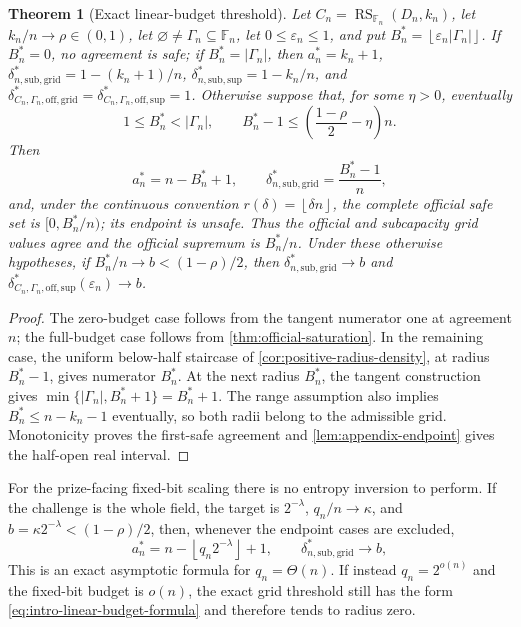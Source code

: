 \documentclass[11pt,a4paper]{amsart}
\numberwithin{equation}{section}
\newtheorem{theorem}{Theorem}[section]
\theoremstyle{remark}
\DeclareMathOperator{\RS}{RS}
\newcommand{\F}{\mathbb F}
\newcommand{\eps}{\varepsilon}
\newcommand{\abs}[1]{\lvert #1\rvert}
\newcommand{\floor}[1]{\left\lfloor #1\right\rfloor}
\begin{document}
\begin{theorem}[Exact linear-budget threshold]
\label{thm:intro-unconditional-asymptotic-deep}
Let \(C_n=\RS_{\F_n}(D_n,k_n)\), let \(k_n/n\to\rho\in(0,1)\), let
\(\varnothing\ne\Gamma_n\subseteq\F_n\), let \(0\le\eps_n\le1\), and put
\(B_n^*=\floor{\eps_n\abs{\Gamma_n}}\).
If \(B_n^*=0\), no agreement is safe; if
\(B_n^*=\abs{\Gamma_n}\), then \(a_n^*=k_n+1\),
\(\delta_{n,\mathrm{sub,grid}}^*=1-(k_n+1)/n\),
\(\delta_{n,\mathrm{sub,sup}}^*=1-k_n/n\), and
\(\delta_{C_n,\Gamma_n,\mathrm{off,grid}}^*
=\delta_{C_n,\Gamma_n,\mathrm{off,sup}}^*=1\).
Otherwise suppose that, for some \(\eta>0\), eventually
\[
 1\le B_n^*<\abs{\Gamma_n},\qquad
 B_n^*-1\le\left(\frac{1-\rho}{2}-\eta\right)n.    \tag{1.5}
 \label{eq:intro-linear-budget-range}
\]
Then
\[
 a_n^*=n-B_n^*+1,\qquad
 \delta_{n,\mathrm{sub,grid}}^*=\frac{B_n^*-1}{n},\tag{1.6}
 \label{eq:intro-linear-budget-formula}
\]
and, under the continuous convention \(r(\delta)=\floor{\delta n}\), the
complete official safe set is \([0,B_n^*/n)\); its endpoint is unsafe.
Thus the official and subcapacity grid values agree and the official
supremum is \(B_n^*/n\).
Under these otherwise hypotheses, if \(B_n^*/n\to b<(1-\rho)/2\), then
\(\delta_{n,\mathrm{sub,grid}}^*\to b\) and
\(\delta_{C_n,\Gamma_n,\mathrm{off,sup}}^*(\eps_n)\to b\).
\end{theorem}

\begin{proof}
The zero-budget case follows from the tangent numerator one at agreement
\(n\); the full-budget case follows from
\cref{thm:official-saturation}.  In the remaining case,
the uniform below-half staircase of \cref{cor:positive-radius-density},
at radius \(B_n^*-1\), gives numerator \(B_n^*\).  At the next radius
\(B_n^*\), the tangent construction gives
\(\min\{\abs{\Gamma_n},B_n^*+1\}=B_n^*+1\).
The range assumption also implies \(B_n^*\le n-k_n-1\) eventually, so both
radii belong to the admissible grid.  Monotonicity proves the first-safe
agreement and \cref{lem:appendix-endpoint} gives the half-open real interval.
\end{proof}

For the prize-facing fixed-bit scaling there is no entropy inversion to
perform.  If the challenge is the whole field, the target is
\(2^{-\lambda}\), \(q_n/n\to\kappa\), and
\(b=\kappa2^{-\lambda}<(1-\rho)/2\), then, whenever the endpoint cases are
excluded,
\[
 a_n^*=n-\floor{q_n2^{-\lambda}}+1,\qquad
 \delta_{n,\mathrm{sub,grid}}^*\longrightarrow b, \tag{1.7}
 \label{eq:intro-prize-linear-formula}
\]
This is an exact asymptotic formula for \(q_n=\Theta(n)\).  If instead
\(q_n=2^{o(n)}\) and the fixed-bit budget is \(o(n)\), the exact grid
threshold still has the form \eqref{eq:intro-linear-budget-formula} and
therefore tends to radius zero.
\end{document}
